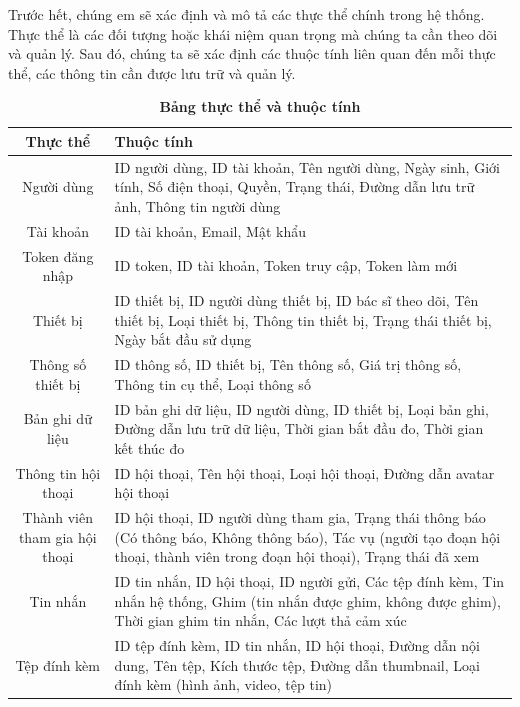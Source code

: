      Trước hết, chúng em sẽ xác định và mô tả các thực thể chính trong hệ
      thống. Thực thể là các đối tượng hoặc khái niệm quan
       trọng mà chúng ta cần theo dõi và quản lý. Sau đó, chúng ta sẽ xác
        định các thuộc tính liên quan đến mỗi thực thể, các thông tin cần
         được lưu trữ và quản lý.

\begin{table}[H]
  \caption{\bfseries \fontsize{12pt}{0pt}\selectfont Bảng thực thể và thuộc tính}
  \centering
  \begin{tabularx}{0.9\textwidth}{|c|X|}
    \hline
    \textbf{Thực thể} & \textbf{Thuộc tính} \\
    \hline
    Người dùng & 
    ID người dùng, ID tài khoản, Tên người dùng, Ngày sinh, Giới tính, Số điện thoại, Quyền, Trạng thái, Đường dẫn lưu trữ ảnh, Thông tin người dùng \\
    \hline
    Tài khoản &
    ID tài khoản, Email, Mật khẩu  \\
    \hline
    Token đăng nhập &
    ID token, ID tài khoản, Token truy cập, Token làm mới \\
    \hline
    Thiết bị & 
    ID thiết bị, ID người dùng thiết bị, ID bác sĩ theo dõi, Tên thiết bị, Loại thiết bị, Thông tin thiết bị, Trạng thái thiết bị, Ngày bắt đầu sử dụng\\
    \hline
    Thông số thiết bị &
    ID thông số, ID thiết bị, Tên thông số, Giá trị thông số, Thông tin cụ thể, Loại thông số \\
    \hline
    Bản ghi dữ liệu & 
    ID bản ghi dữ liệu, ID người dùng, ID thiết bị, Loại bản ghi, Đường dẫn lưu trữ dữ liệu, Thời gian bắt đầu đo, Thời gian kết thúc đo \\
    \hline
    Thông tin hội thoại &
    ID hội thoại, Tên hội thoại, Loại hội thoại, Đường dẫn avatar hội thoại \\
    \hline
    Thành viên tham gia hội thoại &
    ID hội thoại, ID người dùng tham gia, Trạng thái thông báo (Có thông báo, Không thông báo), Tác vụ (người tạo đoạn hội thoại, thành viên trong đoạn hội thoại), Trạng thái đã xem\\
    \hline
    Tin nhắn & 
    ID tin nhắn, ID hội thoại, ID người gửi, Các tệp đính kèm, Tin nhắn hệ thống, Ghim (tin nhắn được ghim, không được ghim), Thời gian ghim tin nhắn, Các lượt thả cảm xúc \\
    \hline
    Tệp đính kèm &
    ID tệp đính kèm, ID tin nhắn, ID hội thoại, Đường dẫn nội dung, Tên tệp, Kích thước tệp, Đường dẫn thumbnail, Loại đính kèm (hình ảnh, video, tệp tin) \\

\end{tabularx}
\end{table}
